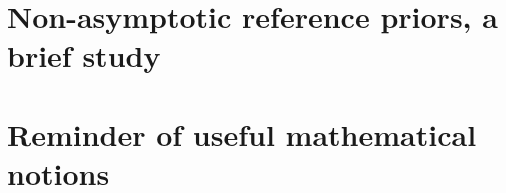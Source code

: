 \documentclass[a4paper]{book}
\begin{document}



\chapter{Non-asymptotic reference priors, a brief study}



\chapter{Reminder of useful mathematical notions}

 

\printbibliography[heading=chapter,title=Bibliography]
\end{document}
